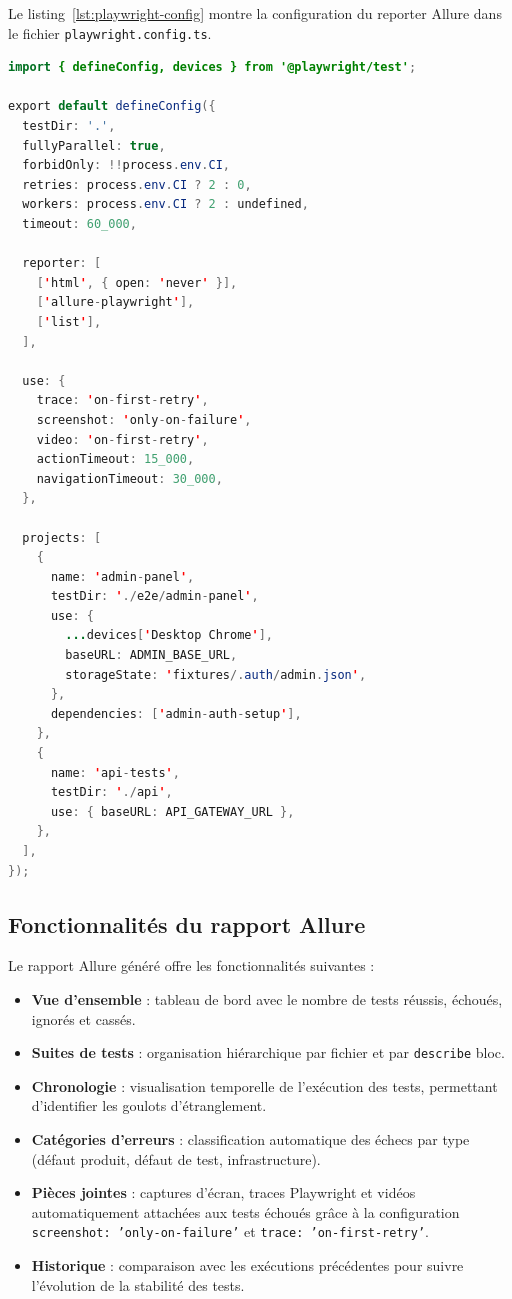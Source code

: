 Le listing~\ref{lst:playwright-config} montre la configuration du reporter Allure
dans le fichier \texttt{playwright.config.ts}.

\begin{lstlisting}[language=Java, caption={Configuration Allure dans playwright.config.ts}, label={lst:playwright-config}]
import { defineConfig, devices } from '@playwright/test';

export default defineConfig({
  testDir: '.',
  fullyParallel: true,
  forbidOnly: !!process.env.CI,
  retries: process.env.CI ? 2 : 0,
  workers: process.env.CI ? 2 : undefined,
  timeout: 60_000,

  reporter: [
    ['html', { open: 'never' }],
    ['allure-playwright'],
    ['list'],
  ],

  use: {
    trace: 'on-first-retry',
    screenshot: 'only-on-failure',
    video: 'on-first-retry',
    actionTimeout: 15_000,
    navigationTimeout: 30_000,
  },

  projects: [
    {
      name: 'admin-panel',
      testDir: './e2e/admin-panel',
      use: {
        ...devices['Desktop Chrome'],
        baseURL: ADMIN_BASE_URL,
        storageState: 'fixtures/.auth/admin.json',
      },
      dependencies: ['admin-auth-setup'],
    },
    {
      name: 'api-tests',
      testDir: './api',
      use: { baseURL: API_GATEWAY_URL },
    },
  ],
});
\end{lstlisting}

\subsection{Fonctionnalités du rapport Allure}

Le rapport Allure généré offre les fonctionnalités suivantes :

\begin{itemize}
  \item \textbf{Vue d'ensemble} : tableau de bord avec le nombre de tests
        réussis, échoués, ignorés et cassés.
  \item \textbf{Suites de tests} : organisation hiérarchique par fichier et
        par \texttt{describe} bloc.
  \item \textbf{Chronologie} : visualisation temporelle de l'exécution des tests,
        permettant d'identifier les goulots d'étranglement.
  \item \textbf{Catégories d'erreurs} : classification automatique des échecs
        par type (défaut produit, défaut de test, infrastructure).
  \item \textbf{Pièces jointes} : captures d'écran, traces Playwright et vidéos
        automatiquement attachées aux tests échoués grâce à la configuration
        \texttt{screenshot: 'only-on-failure'} et \texttt{trace: 'on-first-retry'}.
  \item \textbf{Historique} : comparaison avec les exécutions précédentes pour
        suivre l'évolution de la stabilité des tests.
\end{itemize}

